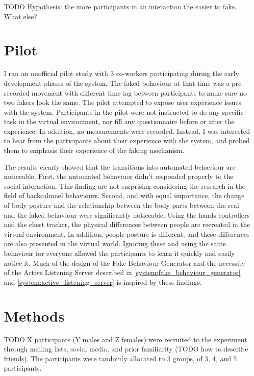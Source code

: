 \documentclass[]{simple-thesis}
\begin{document}
TODO Hypothesis: the more participants in an interaction the easier to fake. What else?

\section{Pilot}

I ran an unofficial pilot study with 3 co-workers participating during the early development phases of the system.
The faked behaviour at that time was a pre-recorded movement with different time lag between participants to make sure no two fakers look the same.
The pilot attempted to expose user experience issues with the system.
Participants in the pilot were not instructed to do any specific task in the virtual environment, nor fill any questionnaire before or after the experience.
In addition, no measurements were recorded.
Instead, I was interested to hear from the participants about their experience with the system, and probed them to emphasis their experience of the faking mechanism.

The results clearly showed that the transitions into automated behaviour are noticeable.
First, the automated behaviuor didn't responded properly to the social interaction.
This finding are not surprising considering the research in the field of backcahnnel behaviours.
Second, and with equal importance, the change of body posture and the relationship between the body parts between the real and the faked behaviour were significantly noticeable.
Using the hands controllers and the chest tracker, the physical differences between people are recreated in the virtual environment.
In addition, people posture is different, and these differences are also presented in the virtual world.
Ignoring these and using the same behaviour for everyone allowed the participants to learn it quickly and easily notice it.
Much of the design of the Fake Behaviour Generator and the necessity of the Active Listening Server described in \ref{system:fake_behaviour_generator} and \ref{system:active_listening_server} is inspired by these findings.

\section{Methods}

TODO X participants (Y males and Z females) were recruited to the experiment through mailing lists, social media, and prior familiarity (TODO how to describe friends).
The participants were randomly allocated to 3 groups, of 3, 4, and 5 participants.
\end{document}
